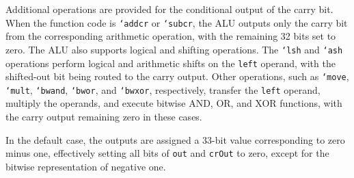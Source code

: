 {Additional operations are provided for the conditional output of the carry bit. When the function code is \texttt{`addcr} or \texttt{`subcr}, the ALU outputs only the carry bit from the corresponding arithmetic operation, with the remaining 32 bits set to zero. The ALU also supports logical and shifting operations. The \texttt{`lsh} and \texttt{`ash} operations perform logical and arithmetic shifts on the \texttt{left} operand, with the shifted-out bit being routed to the carry output. Other operations, such as \texttt{`move}, \texttt{`mult}, \texttt{`bwand}, \texttt{`bwor}, and \texttt{`bwxor}, respectively, transfer the \texttt{left} operand, multiply the operands, and execute bitwise AND, OR, and XOR functions, with the carry output remaining zero in these cases.

In the default case, the outputs are assigned a 33-bit value corresponding to zero minus one, effectively setting all bits of \texttt{out} and \texttt{crOut} to zero, except for the bitwise representation of negative one. 
}%


